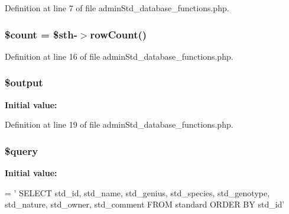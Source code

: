 Definition at line 7 of file admin\-Std\-\_\-database\-\_\-functions.\-php.

\hypertarget{admin_std__database__functions_8php_af789423037bbc89dc7c850e761177570}{
\subsubsection[{\$count}]{\setlength{\rightskip}{0pt plus 5cm}\$count = \$sth-\/$>$row\-Count()}}\label{admin_std__database__functions_8php_af789423037bbc89dc7c850e761177570}


Definition at line 16 of file admin\-Std\-\_\-database\-\_\-functions.\-php.

\hypertarget{admin_std__database__functions_8php_a73004ce9cd673c1bfafd1dc351134797}{
\subsubsection[{\$output}]{\setlength{\rightskip}{0pt plus 5cm}\$output}}\label{admin_std__database__functions_8php_a73004ce9cd673c1bfafd1dc351134797}
{\bfseries Initial value\-:}


Definition at line 19 of file admin\-Std\-\_\-database\-\_\-functions.\-php.

\hypertarget{admin_std__database__functions_8php_af59a5f7cd609e592c41dc3643efd3c98}{
\subsubsection[{\$query}]{\setlength{\rightskip}{0pt plus 5cm}\$query}}\label{admin_std__database__functions_8php_af59a5f7cd609e592c41dc3643efd3c98}
{\bfseries Initial value\-:}
\begin{DoxyCode}
= \textcolor{stringliteral}{'}
\textcolor{stringliteral}{    SELECT std\_id, std\_name, std\_genius, std\_species, std\_genotype, std\_nature, std\_owner, std\_comment }
\textcolor{stringliteral}{    FROM standard}
\textcolor{stringliteral}{    ORDER BY std\_id'}
\end{DoxyCode}



